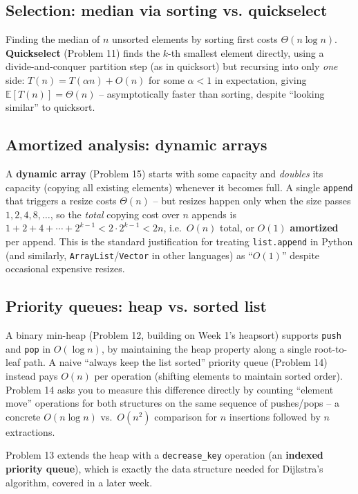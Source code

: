 \documentclass[11pt]{article}
\begin{document}
\subsection{Selection: median via sorting vs. quickselect}

Finding the median of $n$ unsorted elements by sorting first costs $\Theta(n \log n)$.
\textbf{Quickselect} (Problem 11) finds the $k$-th smallest element directly, using a
divide-and-conquer partition step (as in quicksort) but recursing into only \emph{one}
side: $T(n) = T(\alpha n) + O(n)$ for some $\alpha < 1$ in expectation, giving
$\mathbb{E}[T(n)] = \Theta(n)$ -- asymptotically faster than sorting, despite ``looking
similar'' to quicksort.

\subsection{Amortized analysis: dynamic arrays}

A \textbf{dynamic array} (Problem 15) starts with some capacity and \emph{doubles} its
capacity (copying all existing elements) whenever it becomes full. A single \texttt{append}
that triggers a resize costs $\Theta(n)$ -- but resizes happen only when the size passes
$1, 2, 4, 8, \ldots$, so the \emph{total} copying cost over $n$ appends is
$1+2+4+\cdots+2^{k-1} < 2 \cdot 2^{k-1} < 2n$, i.e.\ $O(n)$ total, or $O(1)$
\textbf{amortized} per append. This is the standard justification for treating
\texttt{list.append} in Python (and similarly, \texttt{ArrayList}/\texttt{Vector} in other
languages) as ``$O(1)$'' despite occasional expensive resizes.

\subsection{Priority queues: heap vs. sorted list}

A binary min-heap (Problem 12, building on Week 1's heapsort) supports \texttt{push} and
\texttt{pop} in $O(\log n)$, by maintaining the heap property along a single root-to-leaf
path. A naive ``always keep the list sorted'' priority queue (Problem 14) instead pays
$O(n)$ per operation (shifting elements to maintain sorted order). Problem 14 asks you to
measure this difference directly by counting ``element move'' operations for both
structures on the same sequence of pushes/pops -- a concrete $O(n \log n)$ vs.\ $O(n^2)$
comparison for $n$ insertions followed by $n$ extractions.

Problem 13 extends the heap with a \texttt{decrease\_key} operation (an \textbf{indexed
priority queue}), which is exactly the data structure needed for Dijkstra's algorithm,
covered in a later week.
\end{document}
